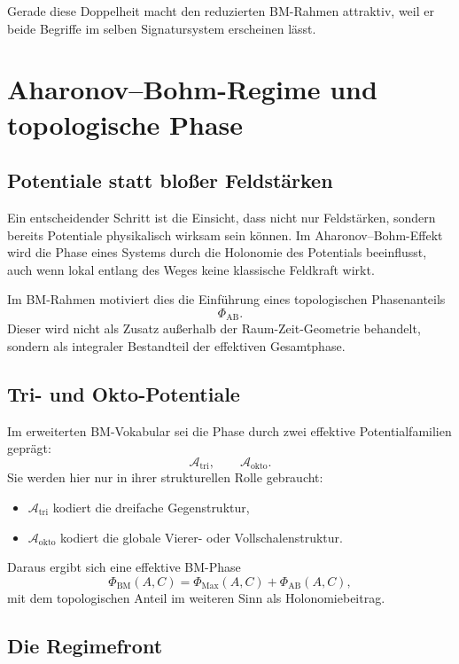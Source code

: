 \documentclass[11pt,a4paper]{article}
\theoremstyle{definition}
\theoremstyle{plain}
\begin{document}
	Gerade diese Doppelheit macht den reduzierten BM-Rahmen attraktiv, weil er beide Begriffe im selben Signatursystem erscheinen lässt.
	
	\section{Aharonov--Bohm-Regime und topologische Phase}
	
	\subsection{Potentiale statt bloßer Feldstärken}
	
	Ein entscheidender Schritt ist die Einsicht, dass nicht nur Feldstärken, sondern bereits Potentiale physikalisch wirksam sein können. Im Aharonov--Bohm-Effekt wird die Phase eines Systems durch die Holonomie des Potentials beeinflusst, auch wenn lokal entlang des Weges keine klassische Feldkraft wirkt.
	
	Im BM-Rahmen motiviert dies die Einführung eines topologischen Phasenanteils
	\[
	\Phi_{\mathrm{AB}}.
	\]
	Dieser wird nicht als Zusatz außerhalb der Raum-Zeit-Geometrie behandelt, sondern als integraler Bestandteil der effektiven Gesamtphase.
	
	\subsection{Tri- und Okto-Potentiale}
	
	Im erweiterten BM-Vokabular sei die Phase durch zwei effektive Potentialfamilien geprägt:
	\[
	\mathcal A_{\mathrm{tri}},
	\qquad
	\mathcal A_{\mathrm{okto}}.
	\]
	Sie werden hier nur in ihrer strukturellen Rolle gebraucht:
	\begin{itemize}[leftmargin=2em]
		\item $\mathcal A_{\mathrm{tri}}$ kodiert die dreifache Gegenstruktur,
		\item $\mathcal A_{\mathrm{okto}}$ kodiert die globale Vierer- oder Vollschalenstruktur.
	\end{itemize}
	
	Daraus ergibt sich eine effektive BM-Phase
	\[
	\Phi_{\mathrm{BM}}(A,C)
	=
	\Phi_{\mathrm{Max}}(A,C)+\Phi_{\mathrm{AB}}(A,C),
	\]
	mit dem topologischen Anteil im weiteren Sinn als Holonomiebeitrag.
	
	\subsection{Die Regimefront}
	
\end{document}
